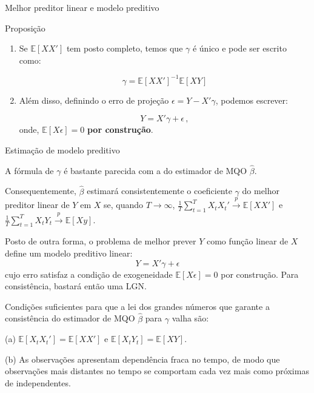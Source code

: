 \documentclass[11pt]{beamer}
\newenvironment{halfwideitemize}{\itemize\addtolength{\itemsep}{0.5em}}{\enditemize}
\begin{document}
	\begin{frame}{Melhor preditor linear e modelo preditivo}
			\begin{block}{Proposição}
			\begin{enumerate}
				\item 		Se $\mathbb{E}[XX']$ tem posto completo, temos que $\gamma$ é único e pode ser escrito como:
				
				$$\gamma = \mathbb{E}[XX']^{-1}\mathbb{E}[XY]$$
				
				\item Além disso, definindo o erro de projeção $\epsilon = Y- X'\gamma$, podemos escrever:
				
				$$Y = X'\gamma + \epsilon \, ,$$
				onde, $\mathbb{E}[X \epsilon] = 0$ \textbf{por construção}.
				
			\end{enumerate}
			
		\end{block}
	\end{frame}
	\begin{frame}{Estimação de modelo preditivo}
		\begin{halfwideitemize}
			\item A fórmula de $\gamma$ é bastante parecida com a do estimador de MQO $\hat{\beta}$.
			\begin{halfwideitemize}
				\item Consequentemente, $\hat{\beta}$ estimará consistentemente o coeficiente $\gamma$ do melhor preditor linear de $Y$ em $X$ se, quando $T \to \infty$, $\frac{1}{T}\sum_{t=1}^T X_t X_t' \overset{p}{\to} \mathbb{E}[XX']$ e $\frac{1}{T}\sum_{t=1}^T X_t Y_t \overset{p}{\to} \mathbb{E}[X y]$.
			\end{halfwideitemize}
			\item Posto de outra forma, o problema de melhor prever $Y$ como função linear de $X$ define um {\color{blue}modelo preditivo linear}:
			$$Y = X'\gamma + \epsilon $$
			cujo erro satisfaz a condição de exogeneidade $\mathbb{E}[X\epsilon] = 0$ {\color{red}por construção}. Para consistência, bastará então uma LGN.
		\end{halfwideitemize}
			\begin{halfwideitemize}
			\item Condições suficientes para que a lei dos grandes números que garante a consistência do estimador de MQO $\hat{\beta}$ para $\gamma$ valha são:
			\begin{halfwideitemize}
				\item[(a)] $\mathbb{E}[X_t X_t'] = \mathbb{E}[XX']$ e $\mathbb{E}[X_t Y_t]=\mathbb{E}[X Y]$.
				\item[(b)] {\color{blue}As observações apresentam dependência fraca no tempo}, de modo que observações mais distantes no tempo se comportam cada vez mais como próximas de independentes.
			\end{halfwideitemize}
		\end{halfwideitemize}
	\end{frame}
\end{document}
